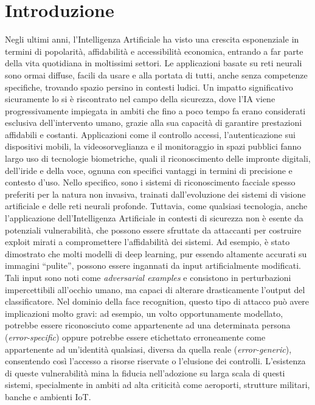 \chapter*{Introduzione}
    Negli ultimi anni, l’Intelligenza Artificiale ha visto una crescita esponenziale in termini di popolarità, affidabilità e accessibilità economica, entrando a far parte della vita quotidiana in moltissimi settori. Le applicazioni basate su reti neurali sono ormai diffuse, facili da usare e alla portata di tutti, anche senza competenze specifiche, trovando spazio persino in contesti ludici. Un impatto significativo sicuramente lo si è riscontrato nel campo della sicurezza, dove l'IA viene progressivamente impiegata in ambiti che fino a poco tempo fa erano considerati esclusiva dell’intervento umano, grazie alla sua capacità di garantire prestazioni affidabili e costanti.
    Applicazioni come il controllo accessi, l’autenticazione sui dispositivi mobili, la videosorveglianza e il monitoraggio in spazi pubblici fanno largo uso di tecnologie biometriche, quali il riconoscimento delle impronte digitali, dell’iride e della voce, ognuna con specifici vantaggi in termini di precisione e contesto d’uso. Nello specifico, sono i sistemi di riconoscimento facciale spesso preferiti per la natura non invasiva, trainati dall’evoluzione dei sistemi di visione artificiale e delle reti neurali profonde.
    Tuttavia, come qualsiasi tecnologia, anche l’applicazione dell’Intelligenza Artificiale in contesti di sicurezza non è esente da potenziali vulnerabilità, che possono essere sfruttate da attaccanti per costruire exploit mirati a compromettere l’affidabilità dei sistemi. Ad esempio, è stato dimostrato che molti modelli di deep learning, pur essendo altamente accurati su immagini ``pulite'', possono essere ingannati da input artificialmente modificati. Tali input sono noti come \textit{adversarial examples} e consistono in perturbazioni impercettibili all’occhio umano, ma capaci di alterare drasticamente l’output del classificatore.
    Nel dominio della face recognition, questo tipo di attacco può avere implicazioni molto gravi: ad esempio, un volto opportunamente modellato, potrebbe essere riconosciuto come appartenente ad una determinata persona (\textit{error-specific}) oppure potrebbe essere etichettato erroneamente come appartenente ad un'identità qualsiasi, diversa da quella reale (\textit{error-generic}), consentendo così l’accesso a risorse riservate o l’elusione dei controlli. L’esistenza di queste vulnerabilità mina la fiducia nell’adozione su larga scala di questi sistemi, specialmente in ambiti ad alta criticità come aeroporti, strutture militari, banche e ambienti IoT.

